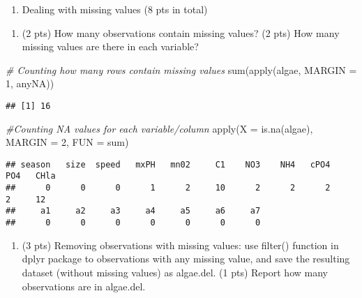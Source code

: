 \documentclass[
]{article}
\newenvironment{Shaded}{\begin{snugshade}}{\end{snugshade}}
\newcommand{\AttributeTok}[1]{\textcolor[rgb]{0.77,0.63,0.00}{#1}}
\newcommand{\CommentTok}[1]{\textcolor[rgb]{0.56,0.35,0.01}{\textit{#1}}}
\newcommand{\DecValTok}[1]{\textcolor[rgb]{0.00,0.00,0.81}{#1}}
\newcommand{\FunctionTok}[1]{\textcolor[rgb]{0.00,0.00,0.00}{#1}}
\newcommand{\NormalTok}[1]{#1}
\providecommand{\tightlist}{%
  \setlength{\itemsep}{0pt}\setlength{\parskip}{0pt}}
\begin{document}
\begin{enumerate}
\def\labelenumi{\arabic{enumi}.}
\setcounter{enumi}{2}
\tightlist
\item
  Dealing with missing values (8 pts in total)
\end{enumerate}

\begin{enumerate}
\def\labelenumi{\alph{enumi}.}
\tightlist
\item
  (2 pts) How many observations contain missing values? (2 pts) How many
  missing values are there in each variable?
\end{enumerate}

\begin{Shaded}
\begin{Highlighting}[]
\CommentTok{\# Counting how many rows contain missing values}
\FunctionTok{sum}\NormalTok{(}\FunctionTok{apply}\NormalTok{(algae, }\AttributeTok{MARGIN =} \DecValTok{1}\NormalTok{, anyNA))}
\end{Highlighting}
\end{Shaded}

\begin{verbatim}
## [1] 16
\end{verbatim}

\begin{Shaded}
\begin{Highlighting}[]
\CommentTok{\#Counting NA values for each variable/column}
\FunctionTok{apply}\NormalTok{(}\AttributeTok{X =} \FunctionTok{is.na}\NormalTok{(algae), }\AttributeTok{MARGIN =} \DecValTok{2}\NormalTok{, }\AttributeTok{FUN =}\NormalTok{ sum)}
\end{Highlighting}
\end{Shaded}

\begin{verbatim}
## season   size  speed   mxPH   mn02     C1    NO3    NH4   cPO4    PO4   CHla 
##      0      0      0      1      2     10      2      2      2      2     12 
##     a1     a2     a3     a4     a5     a6     a7 
##      0      0      0      0      0      0      0
\end{verbatim}

\begin{enumerate}
\def\labelenumi{\alph{enumi}.}
\setcounter{enumi}{1}
\tightlist
\item
  (3 pts) Removing observations with missing values: use filter()
  function in dplyr package to observations with any missing value, and
  save the resulting dataset (without missing values) as algae.del. (1
  pts) Report how many observations are in algae.del.
\end{enumerate}
\end{document}
